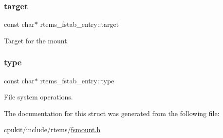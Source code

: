 \subsubsection{\texorpdfstring{target}{target}}
{\footnotesize\ttfamily const char$\ast$ rtems\+\_\+fstab\+\_\+entry\+::target}

Target for the mount. \mbox{\label{structrtems__fstab__entry_aa7820df05698d0bfd9804ff345ced66c}} 
\subsubsection{\texorpdfstring{type}{type}}
{\footnotesize\ttfamily const char$\ast$ rtems\+\_\+fstab\+\_\+entry\+::type}

File system operations. 

The documentation for this struct was generated from the following file\+:\begin{DoxyCompactItemize}
\item 
cpukit/include/rtems/\mbox{\hyperlink{fsmount_8h}{fsmount.\+h}}\end{DoxyCompactItemize}
